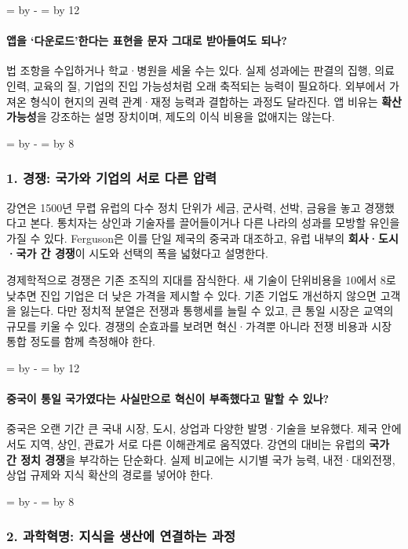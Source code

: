 \documentclass[10pt,a4paper]{article}
\newcommand{\ReserveQuestionSpace}{%
  \par\begingroup
  \dimen0=\pagegoal \advance\dimen0 by -\pagetotal
  \dimen2=\baselineskip \multiply\dimen2 by 12
  \ifdim\dimen0<\dimen2 \newpage\fi
  \endgroup}
\newcommand{\ReserveReadingSectionSpace}{%
  \par\begingroup
  \dimen0=\pagegoal \advance\dimen0 by -\pagetotal
  \dimen2=\baselineskip \multiply\dimen2 by 8
  \ifdim\dimen0<\dimen2 \newpage\fi
  \endgroup}
\begin{document}
\ReserveQuestionSpace
\paragraph{앱을 ‘다운로드’한다는 표현을 문자 그대로 받아들여도 되나?}
법 조항을 수입하거나 학교·병원을 세울 수는 있다. 실제 성과에는 판결의 집행, 의료 인력, 교육의 질, 기업의 진입 가능성처럼 오래 축적되는 능력이 필요하다. 외부에서 가져온 형식이 현지의 권력 관계·재정 능력과 결합하는 과정도 달라진다. 앱 비유는 \textbf{확산 가능성}을 강조하는 설명 장치이며, 제도의 이식 비용을 없애지는 않는다.\par

\ReserveReadingSectionSpace
\subsubsection*{1. 경쟁: 국가와 기업의 서로 다른 압력}

강연은 1500년 무렵 유럽의 다수 정치 단위가 세금, 군사력, 선박, 금융을 놓고 경쟁했다고 본다. 통치자는 상인과 기술자를 끌어들이거나 다른 나라의 성과를 모방할 유인을 가질 수 있다. Ferguson은 이를 단일 제국의 중국과 대조하고, 유럽 내부의 \textbf{회사·도시·국가 간 경쟁}이 시도와 선택의 폭을 넓혔다고 설명한다.\par

경제학적으로 경쟁은 기존 조직의 지대를 잠식한다. 새 기술이 단위비용을 10에서 8로 낮추면 진입 기업은 더 낮은 가격을 제시할 수 있다. 기존 기업도 개선하지 않으면 고객을 잃는다. 다만 정치적 분열은 전쟁과 통행세를 늘릴 수 있고, 큰 통일 시장은 교역의 규모를 키울 수 있다. 경쟁의 순효과를 보려면 혁신·가격뿐 아니라 전쟁 비용과 시장 통합 정도를 함께 측정해야 한다.\par

\ReserveQuestionSpace
\paragraph{중국이 통일 국가였다는 사실만으로 혁신이 부족했다고 말할 수 있나?}
중국은 오랜 기간 큰 국내 시장, 도시, 상업과 다양한 발명·기술을 보유했다. 제국 안에서도 지역, 상인, 관료가 서로 다른 이해관계로 움직였다. 강연의 대비는 유럽의 \textbf{국가 간 정치 경쟁}을 부각하는 단순화다. 실제 비교에는 시기별 국가 능력, 내전·대외전쟁, 상업 규제와 지식 확산의 경로를 넣어야 한다.\par

\ReserveReadingSectionSpace
\subsubsection*{2. 과학혁명: 지식을 생산에 연결하는 과정}
\end{document}
